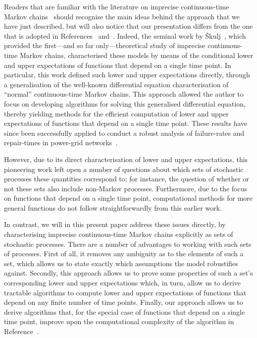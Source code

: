 \documentclass[10pt,a4paper]{paper}
\theoremstyle{definition}
\begin{document}



Readers that are familiar with the literature on imprecise continuous-time Markov chains~\cite{Skulj:2015cq,troffaes2015using} should recognise the main ideas behind the approach that we have just described, but will also notice that our presentation differs from the one that is adopted in References~\cite{Skulj:2015cq} and~\cite{troffaes2015using}. Indeed, the seminal work by {\v{S}}kulj~\cite{Skulj:2015cq}, which provided the first---and so far only---theoretical study of imprecise continuous-time Markov chains, characterised these models by means of the conditional lower and upper expectations of functions that depend on a single time point. In particular, this work defined such lower and upper expectations directly, through a generalisation of the well-known differential equation characterisation of ``normal'' continuous-time Markov chains. This approach allowed the author to focus on developing algorithms for solving this generalised differential equation, thereby yielding methods for the efficient computation of lower and upper expectations of functions that depend on a single time point. These results have since been successfully applied to conduct a robust analysis of failure-rates and repair-times in power-grid networks~\cite{troffaes2015using}.

However, due to its direct characterisation of lower and upper expectations, this pioneering work left open a number of questions about which sets of stochastic processes these quantities correspond to; for instance, the question of whether or not these sets also include non-Markov processes. Furthermore, due to the focus on functions that depend on a single time point, computational methods for more general functions do not follow straightforwardly from this earlier work.

In contrast, we will in this present paper address these issues directly, by characterising imprecise continuous-time Markov chains explicitly as sets of stochastic processes. There are a number of advantages to working with such sets of processes. First of all, it removes any ambiguity as to the elements of such a set, which allows us to state exactly which assumptions the model robustifies against. Secondly, this approach allows us to prove some properties of such a set's corresponding lower and upper expectations which, in turn, allow us to derive tractable algorithms to compute lower and upper expectations of functions that depend on any finite number of time points. Finally, our approach allows us to derive algorithms that, for the special case of functions that depend on a single time point, improve upon the computational complexity of the algorithm in Reference~\cite{Skulj:2015cq}.
\end{document}
